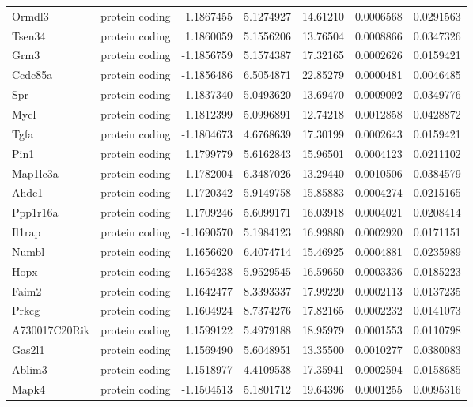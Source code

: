 \documentclass[onehalf,12pt]{beavtex}
\begin{document}
\begin{longtable}{llrrrrr}
  Ormdl3 & protein coding & 1.1867455 & 5.1274927 & 14.61210 & 0.0006568 & 0.0291563\\
  Tsen34 & protein coding & 1.1860059 & 5.1556206 & 13.76504 & 0.0008866 & 0.0347326\\
  \addlinespace
  Grm3 & protein coding & -1.1856759 & 5.1574387 & 17.32165 & 0.0002626 & 0.0159421\\
  Ccdc85a & protein coding & -1.1856486 & 6.5054871 & 22.85279 & 0.0000481 & 0.0046485\\
  Spr & protein coding & 1.1837340 & 5.0493620 & 13.69470 & 0.0009092 & 0.0349776\\
  Mycl & protein coding & 1.1812399 & 5.0996891 & 12.74218 & 0.0012858 & 0.0428872\\
  Tgfa & protein coding & -1.1804673 & 4.6768639 & 17.30199 & 0.0002643 & 0.0159421\\
  \addlinespace
  Pin1 & protein coding & 1.1799779 & 5.6162843 & 15.96501 & 0.0004123 & 0.0211102\\
  Map1lc3a & protein coding & 1.1782004 & 6.3487026 & 13.29440 & 0.0010506 & 0.0384579\\
  Ahdc1 & protein coding & 1.1720342 & 5.9149758 & 15.85883 & 0.0004274 & 0.0215165\\
  Ppp1r16a & protein coding & 1.1709246 & 5.6099171 & 16.03918 & 0.0004021 & 0.0208414\\
  Il1rap & protein coding & -1.1690570 & 5.1984123 & 16.99880 & 0.0002920 & 0.0171151\\
  \addlinespace
  Numbl & protein coding & 1.1656620 & 6.4074714 & 15.46925 & 0.0004881 & 0.0235989\\
  Hopx & protein coding & -1.1654238 & 5.9529545 & 16.59650 & 0.0003336 & 0.0185223\\
  Faim2 & protein coding & 1.1642477 & 8.3393337 & 17.99220 & 0.0002113 & 0.0137235\\
  Prkcg & protein coding & 1.1604924 & 8.7374276 & 17.82165 & 0.0002232 & 0.0141073\\
  A730017C20Rik & protein coding & 1.1599122 & 5.4979188 & 18.95979 & 0.0001553 & 0.0110798\\
  \addlinespace
  Gas2l1 & protein coding & 1.1569490 & 5.6048951 & 13.35500 & 0.0010277 & 0.0380083\\
  Ablim3 & protein coding & -1.1518977 & 4.4109538 & 17.35941 & 0.0002594 & 0.0158685\\
  Mapk4 & protein coding & -1.1504513 & 5.1801712 & 19.64396 & 0.0001255 & 0.0095316\\

\end{longtable}
\end{document}
